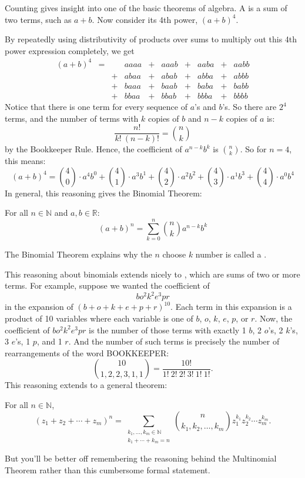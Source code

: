 Counting gives insight into one of the basic theorems of algebra.  A
 is a sum of two terms, such as $a + b$.  Now consider its
4th power, $(a + b)^4$.

By repeatedly using distributivity of products over sums to multiply
out this 4th power expression completely, we get
\[\begin{array}{rccccccccc}
(a + b)^4
   & = &    & aaaa & + & aaab & + & aaba & + & aabb \\
   &   &  + & abaa & + & abab & + & abba & + & abbb \\
   &   &  + & baaa & + & baab & + & baba & + & babb \\
   &   &  + & bbaa & + & bbab & + & bbba & + & bbbb
\end{array}\]
Notice that there is one term for every sequence of $a$'s and $b$'s.  So
there are $2^4$ terms, and the number of terms with $k$ copies of $b$ and
$n - k$ copies of $a$ is:
\[
\frac{n!}{k!\ (n-k)!} = \binom{n}{k}
\]
by the Bookkeeper Rule.  Hence, the coefficient of $a^{n-k} b^k$ is
$\binom{n}{k}$.  So for $n = 4$, this means:
\[
(a + b)^4 =
    \binom{4}{0} \cdot a^4 b^0 +
    \binom{4}{1} \cdot a^3 b^1 +
    \binom{4}{2} \cdot a^2 b^2 +
    \binom{4}{3} \cdot a^1 b^3 +
    \binom{4}{4} \cdot a^0 b^4
\]
In general, this reasoning gives the Binomial Theorem:

\begin{theorem}\label{thm:binomial}
For all $n \in \mathbb{N}$ and $a, b \in \mathbb{R}$:
%
\[
(a + b)^n = \sum_{k=0}^n \binom{n}{k} a^{n-k} b^k
\]
\end{theorem}
The Binomial Theorem explains why the $n$ choose $k$ number is called
a .

This reasoning about binomials extends nicely to ,
which are sums of two or more terms.  For example, suppose we wanted
the coefficient of
%
\[
b o^2 k^2 e^3 p r
\]
%
in the expansion of $(b + o + k + e + p + r)^{10}$.  Each term in this
expansion is a product of 10 variables where each variable is one of
$b$, $o$, $k$, $e$, $p$, or $r$.  Now, the coefficient of $b o^2 k^2
e^3 p r$ is the number of those terms with exactly 1 $b$, 2 $o$'s, 2
$k$'s, 3 $e$'s, 1 $p$, and 1 $r$.  And the number of such terms is
precisely the number of rearrangements of the word BOOKKEEPER:
\[
\binom{10}{1,2,2,3,1,1} = \frac{10!}{1!\ 2!\ 2!\ 3!\ 1!\ 1!}.
\]
This reasoning extends to a general theorem:
\begin{theorem}\label{multinom-thm}
For all $n \in \mathbb{N}$,
\[
(z_1 + z_2 + \cdots + z_m)^n =
   \sum_{\substack{k_1, \dots, k_m \in \mathbb{N} \\
                   k_1 + \cdots + k_m = n}}
   \binom{n}{k_1, k_2, \dots, k_m} z_1^{k_1} z_2^{k_2} \cdots z_m^{k_m}.
\]
\end{theorem}
But you'll be better off remembering the reasoning behind the Multinomial
Theorem rather than this cumbersome formal statement.


